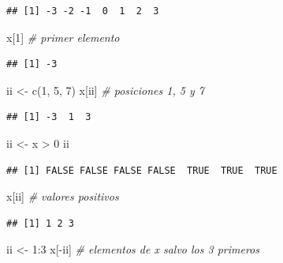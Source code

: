 \documentclass[
]{book}
\newenvironment{Shaded}{\begin{snugshade}}{\end{snugshade}}
\newcommand{\CommentTok}[1]{\textcolor[rgb]{0.56,0.35,0.01}{\textit{#1}}}
\newcommand{\DecValTok}[1]{\textcolor[rgb]{0.00,0.00,0.81}{#1}}
\newcommand{\FunctionTok}[1]{\textcolor[rgb]{0.00,0.00,0.00}{#1}}
\newcommand{\NormalTok}[1]{#1}
\newcommand{\OtherTok}[1]{\textcolor[rgb]{0.56,0.35,0.01}{#1}}
\newcommand{\SpecialCharTok}[1]{\textcolor[rgb]{0.00,0.00,0.00}{#1}}
\theoremstyle{break}
\theoremstyle{nonumberplain}
\begin{document}
\begin{verbatim}
## [1] -3 -2 -1  0  1  2  3
\end{verbatim}

\begin{Shaded}
\begin{Highlighting}[]
\NormalTok{x[}\DecValTok{1}\NormalTok{]  }\CommentTok{\# primer elemento}
\end{Highlighting}
\end{Shaded}

\begin{verbatim}
## [1] -3
\end{verbatim}

\begin{Shaded}
\begin{Highlighting}[]
\NormalTok{ii }\OtherTok{\textless{}{-}} \FunctionTok{c}\NormalTok{(}\DecValTok{1}\NormalTok{, }\DecValTok{5}\NormalTok{, }\DecValTok{7}\NormalTok{)}
\NormalTok{x[ii] }\CommentTok{\# posiciones 1, 5 y 7}
\end{Highlighting}
\end{Shaded}

\begin{verbatim}
## [1] -3  1  3
\end{verbatim}

\begin{Shaded}
\begin{Highlighting}[]
\NormalTok{ii }\OtherTok{\textless{}{-}}\NormalTok{ x }\SpecialCharTok{\textgreater{}} \DecValTok{0}
\NormalTok{ii}
\end{Highlighting}
\end{Shaded}

\begin{verbatim}
## [1] FALSE FALSE FALSE FALSE  TRUE  TRUE  TRUE
\end{verbatim}

\begin{Shaded}
\begin{Highlighting}[]
\NormalTok{x[ii]  }\CommentTok{\# valores positivos}
\end{Highlighting}
\end{Shaded}

\begin{verbatim}
## [1] 1 2 3
\end{verbatim}

\begin{Shaded}
\begin{Highlighting}[]
\NormalTok{ii }\OtherTok{\textless{}{-}} \DecValTok{1}\SpecialCharTok{:}\DecValTok{3}
\NormalTok{x[}\SpecialCharTok{{-}}\NormalTok{ii]  }\CommentTok{\# elementos de x salvo los 3 primeros}
\end{Highlighting}
\end{Shaded}
\end{document}
